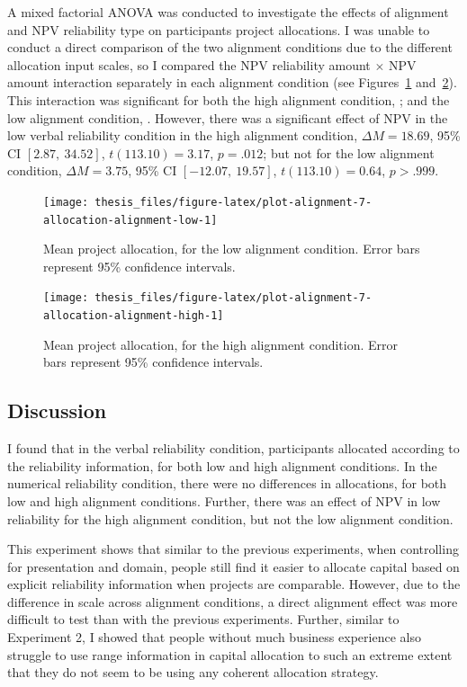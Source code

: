 \documentclass[a4paper, nobind, dvipsnames]{templates/ociamthesis}
\theoremstyle{definition}
\theoremstyle{definition}
\theoremstyle{definition}
\theoremstyle{definition}
\theoremstyle{remark}
\begin{document}
A mixed factorial ANOVA was conducted to investigate the effects of alignment
and NPV reliability type on participants project allocations. I was unable to
conduct a direct comparison of the two alignment conditions due to the different
allocation input scales, so I compared the NPV reliability amount \(\times\) NPV
amount interaction separately in each alignment condition (see
Figures~\ref{fig:plot-alignment-7-allocation-alignment-low}
and~\ref{fig:plot-alignment-7-allocation-alignment-high}). This interaction was
significant for both the high alignment condition,
;
and the low alignment condition,
.
However, there was a significant effect of NPV in the low verbal reliability
condition in the high alignment condition,
\(\Delta M = 18.69\), 95\% CI \([2.87,~34.52]\), \(t(113.10) = 3.17\), \(p = .012\); but not
for the low alignment condition,
\(\Delta M = 3.75\), 95\% CI \([-12.07,~19.57]\), \(t(113.10) = 0.64\), \(p > .999\).



\begin{figure}
\texttt{[image: thesis\_files/figure-latex/plot-alignment-7-allocation-alignment-low-1]} \caption{Mean project allocation, for the low alignment condition. Error bars represent 95\% confidence intervals.}\label{fig:plot-alignment-7-allocation-alignment-low}
\end{figure}



\begin{figure}
\texttt{[image: thesis\_files/figure-latex/plot-alignment-7-allocation-alignment-high-1]} \caption{Mean project allocation, for the high alignment condition. Error bars represent 95\% confidence intervals.}\label{fig:plot-alignment-7-allocation-alignment-high}
\end{figure}

\subsection{Discussion}

I found that in the verbal reliability condition, participants allocated
according to the reliability information, for both low and high alignment
conditions. In the numerical reliability condition, there were no differences in
allocations, for both low and high alignment conditions. Further, there was an
effect of NPV in low reliability for the high alignment condition, but not the
low alignment condition.

This experiment shows that similar to the previous experiments, when controlling
for presentation and domain, people still find it easier to allocate capital
based on explicit reliability information when projects are comparable. However,
due to the difference in scale across alignment conditions, a direct alignment
effect was more difficult to test than with the previous experiments. Further,
similar to Experiment 2, I showed that people without much business experience
also struggle to use range information in capital allocation to such an extreme
extent that they do not seem to be using any coherent allocation strategy.
\end{document}
